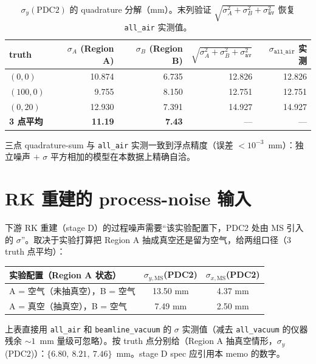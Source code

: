 \documentclass[a4paper, 11pt]{article}
\begin{document}
\begin{table}[H]
\centering
\caption{$\sigma_y(\mathrm{PDC2})$ 的 quadrature 分解（mm）。末列验证 $\sqrt{\sigma_A^{2}+\sigma_B^{2}+\sigma_{\mathtt{av}}^2}$ 恢复 \texttt{all\_air} 实测值。}
\label{tab:delta_quadrature}
\begin{tabular}{lrrrr}
\toprule
truth & $\sigma_A$ (Region A) & $\sigma_B$ (Region B) & $\sqrt{\sigma_A^{2}+\sigma_B^{2}+\sigma_{\mathtt{av}}^2}$ & $\sigma_{\mathtt{all\_air}}$ 实测 \\
\midrule
$(0,0)$   & 10.874 & 6.735 & 12.826 & 12.826 \\
$(100,0)$ &  9.755 & 8.150 & 12.751 & 12.751 \\
$(0,20)$  & 12.930 & 7.391 & 14.927 & 14.927 \\
\midrule
\textbf{3 点平均} & \textbf{11.19} & \textbf{7.43} & — & — \\
\bottomrule
\end{tabular}
\end{table}

三点 quadrature-sum 与 \texttt{all\_air} 实测一致到浮点精度（误差 $< 10^{-3}$~mm）：独立噪声 $+$ $\sigma$ 平方相加的模型在本数据上精确自洽。

\section{RK 重建的 process-noise 输入}

下游 RK 重建（stage D）的过程噪声需要“该实验配置下，PDC2 处由 MS 引入的 $\sigma$”。取决于实验打算把 Region A 抽成真空还是留为空气，给两组口径（3 truth 点平均）：

\begin{center}
\begin{tabular}{lcc}
\toprule
实验配置（Region A 状态） & $\sigma_{y,\mathrm{MS}}$(PDC2) & $\sigma_{x,\mathrm{MS}}$(PDC2) \\
\midrule
A = 空气（未抽真空），B = 空气      & 13.50 mm & 4.37 mm \\
A = 真空（抽真空），B = 空气        &  7.49 mm & 2.50 mm \\
\bottomrule
\end{tabular}
\end{center}

上表直接用 \texttt{all\_air} 和 \texttt{beamline\_vacuum} 的 $\sigma$ 实测值（减去 \texttt{all\_vacuum} 的仪器残余 $\sim 1$~mm 量级可忽略）。按 truth 点分别给（Region A 抽真空情形，$\sigma_y$(PDC2)）：$\{6.80,\ 8.21,\ 7.46\}$~mm。stage D spec 应引用本 memo 的数字。
\end{document}
